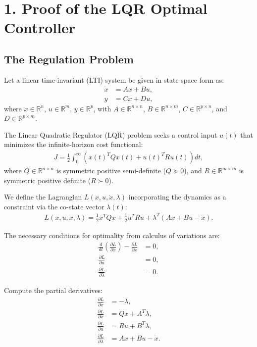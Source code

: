 \section*{1. Proof of the LQR Optimal Controller}
\label{sec:lqr-proof}

\subsection*{The Regulation Problem}
Let a linear time-invariant (LTI) system be given in state-space form as:
\begin{align*}
\dot{x} &= Ax + Bu, \\
y &= Cx + Du,
\end{align*}
where $x \in \mathbb{R}^n$, $u \in \mathbb{R}^m$, $y \in \mathbb{R}^p$, with $A \in \mathbb{R}^{n \times n}$, $B \in \mathbb{R}^{n \times m}$, $C \in \mathbb{R}^{p \times n}$, and $D \in \mathbb{R}^{p \times m}$.

The Linear Quadratic Regulator (LQR) problem seeks a control input $u(t)$ that minimizes the infinite-horizon cost functional:
\begin{align*}
J = \frac{1}{2} \int_0^\infty \left( x(t)^T Q x(t) + u(t)^T R u(t) \right) dt,
\end{align*}
where $Q \in \mathbb{R}^{n \times n}$ is symmetric positive semi-definite ($Q \succeq 0$), and $R \in \mathbb{R}^{m \times m}$ is symmetric positive definite ($R \succ 0$).

\hrulefill

We define the Lagrangian \( L(x, u, \dot{x}, \lambda) \) incorporating the dynamics as a constraint via the co-state vector $\lambda(t)$:
\begin{align*}
L(x,u,\dot{x},\lambda) = \frac{1}{2} x^T Q x + \frac{1}{2} u^T R u + \lambda^T (Ax + Bu - \dot{x}).
\end{align*}

\hrulefill

The necessary conditions for optimality from calculus of variations are:
\begin{align*}
\frac{d}{dt} \left( \frac{\partial L}{\partial \dot{x}} \right) - \frac{\partial L}{\partial x} &= 0, \\
\frac{\partial L}{\partial u} &= 0, \\
\frac{\partial L}{\partial \lambda} &= 0.
\end{align*}

Compute the partial derivatives:
\begin{align*}
\frac{\partial L}{\partial \dot{x}} &= -\lambda, \\
\frac{\partial L}{\partial x} &= Qx + A^T \lambda, \\
\frac{\partial L}{\partial u} &= R u + B^T \lambda, \\
\frac{\partial L}{\partial \lambda} &= Ax + Bu - \dot{x}.
\end{align*}

